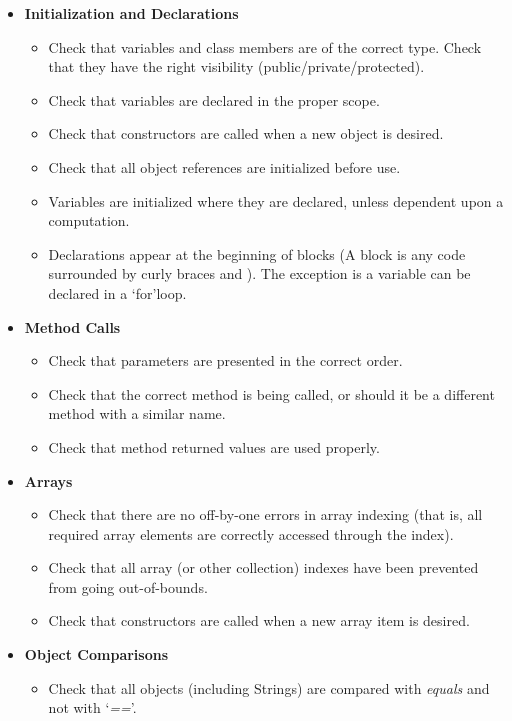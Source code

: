 \documentclass[\mainpath/main]{subfiles}
\begin{document}
\begin{itemize}
	   \item \textbf{Initialization and Declarations}
	   \begin{itemize}
	   	\item Check that variables and class members are of the correct type. Check that they have the right visibility (public/private/protected).
	   	\item Check that variables are declared in the proper scope.
	   	\item Check that constructors are called when a new object is desired.
	   	\item Check that all object references are initialized before use.
	   	\item Variables are initialized where they are declared, unless dependent upon
        a computation.
		\item Declarations appear at the beginning of blocks (A block is any code
         surrounded by curly braces \textbraceleft and \textbraceright ). The exception is a variable can be declared in a \textquoteleft for\textquoteright loop.
	   \end{itemize}
	   
	   \item \textbf{Method Calls}
	   \begin{itemize}
	   	\item Check that parameters are presented in the correct order.
	   	\item Check that the correct method is being called, or should it be a different
		 method with a similar name.
		\item Check that method returned values are used properly.
	   \end{itemize}
	   
	    \item \textbf{Arrays}
	    \begin{itemize}
	    	\item Check that there are no off-by-one errors in array indexing (that is, all required array elements are correctly accessed through the index).
	    	\item Check that all array (or other collection) indexes have been prevented from going out-of-bounds.
	    	\item Check that constructors are called when a new array item is desired.
	    \end{itemize}
	    
	    \item \textbf{Object Comparisons}
	    \begin{itemize}
	    	\item Check that all objects (including Strings) are compared with \textit{equals} and not with \textquoteleft \textit{==}\textquoteright.
	    \end{itemize}
	    

\end{itemize}
\end{document}
